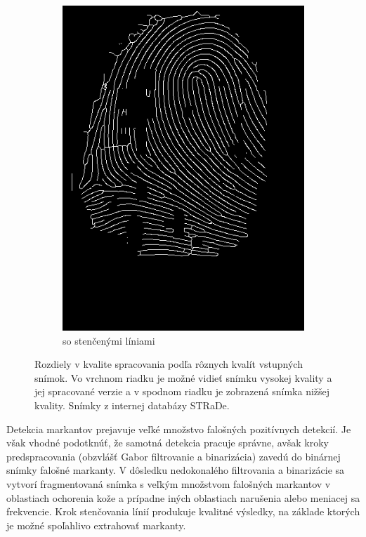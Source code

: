 \begin{figure}[h]
\begin{subfigure}[b]{0.3\linewidth}
      \includegraphics[width=\linewidth]{obrazky-figures/ecsema_thin.png}
      \caption{so stenčenými líniami}
    \end{subfigure}
    \caption{Rozdiely v kvalite spracovania podľa rôznych kvalít vstupných snímok. Vo vrchnom riadku je možné vidieť snímku vysokej kvality a jej spracované
    verzie a v spodnom riadku je zobrazená snímka nižšej kvality. Snímky z internej databázy STRaDe.}
    \label{obr:porovnanie_kvality}
  \end{figure}

  Detekcia markantov prejavuje veľké množstvo falošných pozitívnych detekcií. Je však vhodné podotknúť, že samotná detekcia pracuje správne, avšak kroky
  predspracovania (obzvlášť Gabor filtrovanie a binarizácia) zavedú do binárnej snímky falošné markanty. V dôsledku nedokonalého filtrovania a binarizácie
  sa vytvorí fragmentovaná snímka s veľkým množstvom falošných markantov v oblastiach ochorenia kože a prípadne iných oblastiach narušenia alebo meniacej
  sa frekvencie. Krok stenčovania línií produkuje kvalitné výsledky, na základe ktorých je možné spoľahlivo extrahovať markanty.

